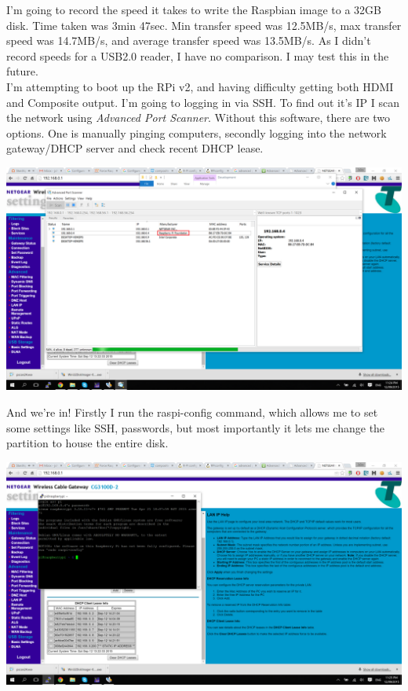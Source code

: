     		I'm going to record the speed it takes to write the Raspbian image to a 32GB disk. Time taken was 3min 47sec. Min transfer speed was 12.5MB/s, max transfer speed was 14.7MB/s, and average transfer speed was 13.5MB/s. As I didn't record speeds for a USB2.0 reader, I have no comparison. I may test this in the future.\\
    		
    		I'm attempting to boot up the RPi v2, and having difficulty getting both HDMI and Composite output. I'm going to logging in via SSH. To find out it's IP I scan the network using \textit{Advanced Port Scanner}. Without this software, there are two options. One is manually pinging computers, secondly logging into the network gateway/DHCP server and check recent DHCP lease.\\
    		
    		\centerline{\includegraphics[width=\linewidth]{images/port_scanner}}
    		\vspace{10pt}
    		
    		And we're in! Firstly I run the raspi-config command, which allows me to set some settings like SSH, passwords, but most importantly it lets me change the partition to house the entire disk.\\
    		
    		\centerline{\includegraphics[width=\linewidth]{images/ssh_login}}
    		\vspace{10pt}
    		
